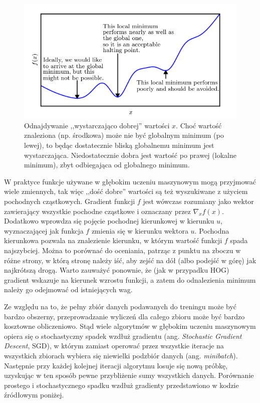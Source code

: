 \documentclass[12pt,a4paper,leqno,oneside,titlepage]{book}
\begin{document}
\begin{figure}[!tbp]
  \centering
  \begin{minipage}[b]{0.5\textheight}
    \includegraphics[width=\textwidth]{pictures/approximate_minimization.png}
  \end{minipage}
  \caption{Odnajdywanie ,,wystarczająco dobrej'' wartości $x$. Choć wartość znaleziona (np. środkowa) może nie być globalnym minimum (po lewej), to będąc dostatecznie bliską globalnemu minimum jest wystarczająca. Niedostatecznie dobra jest wartość po prawej (lokalne minimum), zbyt odbiegająca od globalnego minimum.\cite{Goodfellow-et-al-2016}}
  \label{fig:approximate_minimization}
\end{figure}

W praktyce funkcje używane w głębokim uczeniu maszynowym mogą przyjmować wiele zmiennych, tak więc ,,dość dobre'' wartości są też wyszukiwane z użyciem pochodnych cząstkowych. Gradient funkcji $f$ jest wówczas rozumiany jako wektor zawierający wszystkie pochodne cząstkowe i oznaczany przez $\nabla_{x}f(x)$. Dodatkowo wprowdza się pojęcie pochodnej kierunkowej w kierunku $u$, wyznaczającej jak funkcja $f$ zmienia się w kierunku wektora $u$. Pochodna kierunkowa pozwala na znalezienie kierunku, w którym wartość funkcji $f$ spada najszybciej. Można to porównać do oceniania, patrząc z punktu na zboczu w różne strony, w którą stronę należy iść, aby zejść na dół (albo podejść w górę) jak najkrótszą drogą. Warto zauważyć ponownie, że (jak w przypadku HOG) gradient wskazuje na kierunek wzrostu funkcji, a zatem do odnalezienia minimum należy go odejmować od istniejących wag. \cite{Goodfellow-et-al-2016,StanfordCNN}

Ze względu na to, że pełny zbiór danych podawanych do treningu może być bardzo obszerny, przeprowadzanie wyliczeń dla całego zbioru może być bardzo kosztowne obliczeniowo. Stąd wiele algorytmów w głębokim uczeniu maszynowym opiera się o stochastyczny spadek wzdłuż gradientu (ang. \textit{Stochastic Gradient Descent}, SGD), w którym zamiast operować przez wszystkie iteracje na wszystkich zbiorach wybiera się niewielki podzbiór danych (ang. \textit{minibatch}). Następnie przy każdej kolejnej iteracji algorytmu losuje się nową próbkę, uzyskując w ten sposób pewne przybliżenie sumy wszystkich danych. Porównanie prostego i stochastycznego spadku wzdłuż gradienty przedstawiono w kodzie źródłowym poniżej.
\end{document}
